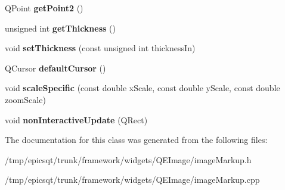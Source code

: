 \begin{DoxyCompactItemize}
\item 
\hypertarget{classmarkupRegion_afd6e69f6ba9e223e3c520076606f7c76}{
QPoint {\bfseries getPoint2} ()}
\label{classmarkupRegion_afd6e69f6ba9e223e3c520076606f7c76}

\item 
\hypertarget{classmarkupRegion_a5743c9267044bf11b5d9471e1c5c6a12}{
unsigned int {\bfseries getThickness} ()}
\label{classmarkupRegion_a5743c9267044bf11b5d9471e1c5c6a12}

\item 
\hypertarget{classmarkupRegion_a0b33e9657e4f29af94bd8dcd595f8910}{
void {\bfseries setThickness} (const unsigned int thicknessIn)}
\label{classmarkupRegion_a0b33e9657e4f29af94bd8dcd595f8910}

\item 
\hypertarget{classmarkupRegion_ac54ee25b778827e637abd32bae344124}{
QCursor {\bfseries defaultCursor} ()}
\label{classmarkupRegion_ac54ee25b778827e637abd32bae344124}

\item 
\hypertarget{classmarkupRegion_a5ecf5a3727d916d21afcdc83ffe5c140}{
void {\bfseries scaleSpecific} (const double xScale, const double yScale, const double zoomScale)}
\label{classmarkupRegion_a5ecf5a3727d916d21afcdc83ffe5c140}

\item 
\hypertarget{classmarkupRegion_a7d4787f3f426ff54d49696aee6d2dd9f}{
void {\bfseries nonInteractiveUpdate} (QRect)}
\label{classmarkupRegion_a7d4787f3f426ff54d49696aee6d2dd9f}

\end{DoxyCompactItemize}


The documentation for this class was generated from the following files:\begin{DoxyCompactItemize}
\item 
/tmp/epicsqt/trunk/framework/widgets/QEImage/imageMarkup.h\item 
/tmp/epicsqt/trunk/framework/widgets/QEImage/imageMarkup.cpp\end{DoxyCompactItemize}
